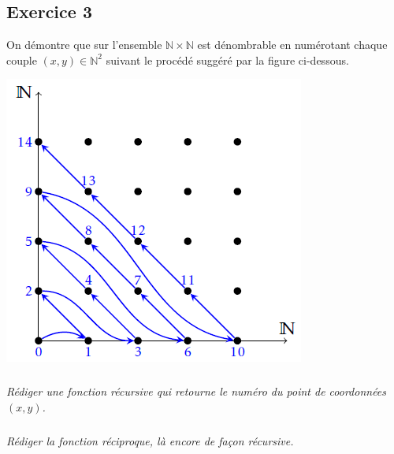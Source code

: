 \documentclass[10pt,fleqn]{book} %
\begin{document}
\begin{multicols}{2}
\section*{Exercice 3}
\setcounter{subparagraph}{0}
On démontre que sur l'ensemble $\mathbb{N}\times \mathbb{N}$ est dénombrable en numérotant chaque couple $(x,y)\in\mathbb{N}^2$ suivant le procédé suggéré par la figure ci-dessous.
\begin{center}
\includegraphics[width=.45\linewidth]{images/fig_01}
\end{center}

\subparagraph{}\textit{Rédiger une fonction récursive qui retourne le numéro du point de coordonnées $(x,y)$.}

\subparagraph{}\textit{Rédiger la fonction réciproque, là encore de façon récursive.}
%
%


\end{multicols}
\end{document}
